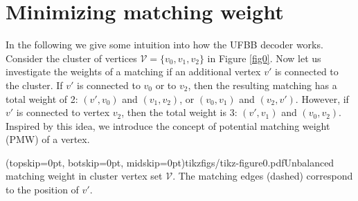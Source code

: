 \section{Minimizing matching weight}\label{sec:matchingweight}

In the following we give some intuition into how the UFBB decoder works. Consider the cluster of vertices $\mathcal{V}=\{v_0,v_1,v_2\}$ in Figure \ref{fig0}. Now let us investigate the weights of a matching if an additional vertex $v'$ is connected to the cluster. 
If $v'$ is connected to $v_0$ or to $v_2$, then the resulting matching has a total weight of 2: $(v',v_0)$ and $(v_1,v_2)$, or $(v_0,v_1)$ and $(v_2,v')$. However, if $v'$ is connected to vertex $v_2$, then the total weight is 3: $(v', v_1)$ and $(v_0, v_2)$. Inspired by this idea, we introduce the concept of potential matching weight (PMW) of a vertex. 

\Figure[h](topskip=0pt, botskip=0pt, midskip=0pt){tikzfigs/tikz-figure0.pdf}{Unbalanced matching weight in cluster vertex set $\mathcal{V}$. The matching edges (dashed) correspond to the position of $v'$.\label{fig0}}


  





